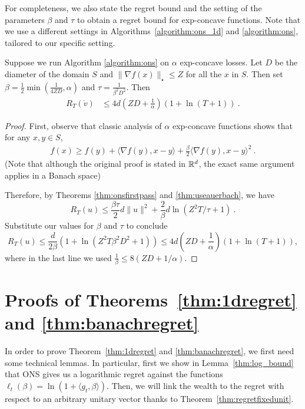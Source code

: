 \documentclass[12pt]{colt2018} %
\renewcommand{\v}{\mathring{v}}
\begin{document}
For completeness, we also state the regret bound and the setting of the parameters $\beta$ and $\tau$ to obtain a regret bound for exp-concave functions. Note that we use a different settings in Algorithms~\ref{algorithm:ons_1d} and \ref{algorithm:ons}, tailored to our specific setting.
\begin{theorem}\label{thm:finalonsbound}
Suppose we run Algorithm \ref{algorithm:ons} on $\alpha$ exp-concave losses. Let $D$ be the diameter of the domain $S$ and $\|\nabla f(x)\|_\star \leq Z$ for all the $x$ in $S$. Then set $\beta = \frac{1}{2}\min\left(\frac{1}{4ZD},\alpha\right)$ and $\tau=\frac{1}{\beta^2D^2}$. Then
\begin{align*}
R_T(\v) &\le 4d\left(ZD + \frac{1}{\alpha}\right)(1+\ln(T+1))~.
\end{align*}
\end{theorem}
%
\begin{proof}
First, observe that classic analysis of $\alpha$ exp-concave functions \citep[Lemma 3]{hazan2007logarithmic} shows that for any $x,y\in S$,
\begin{align*}
f(x)\ge f(y) + \langle \nabla f(y), x-y\rangle +\frac{\beta}{2}\langle \nabla f(y),x-y\rangle^2~.
\end{align*}
(Note that although the original proof is stated in $\mathbb{R}^d$, the exact same argument applies in a Banach space)

Therefore, by Theorems \ref{thm:onsfirstpass} and \ref{thm:useauerbach}, we have
\[
R_T(u) \le \frac{\beta\tau}{2}d\|u\|^2 +\frac{2}{\beta}d\ln(Z^2T/\tau + 1)~.
\]
Substitute our values for $\beta$ and $\tau$ to conclude
\[
R_T(u) 
\le \frac{d}{2\beta}\left(1+\ln(Z^2T\beta^2D^2+1)\right)
\le 4d\left(ZD + \frac{1}{\alpha}\right)(1+\ln(T+1)),
\]
where in the last line we used $\frac{1}{\beta}\le8(ZD + 1/\alpha)$.
\end{proof}


\section{Proofs of Theorems~\ref{thm:1dregret} and \ref{thm:banachregret}}
\label{sec:proof_regret_ons}

In order to prove Theorem~\ref{thm:1dregret} and \ref{thm:banachregret}, we first need some technical lemmas.
In particular, first we show in Lemma~\ref{thm:log_bound} that ONS gives us a logarithmic regret against the functions $\ell_t(\beta)=\ln(1+\langle g_t,\beta\rangle)$. Then, we will link the wealth to the regret with respect to an arbitrary unitary vector thanks to Theorem~\ref{thm:regretfixedunit}.
\end{document}
